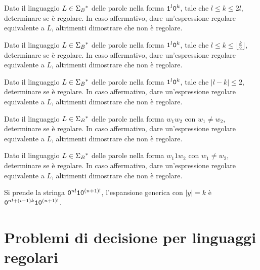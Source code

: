 \begin{Exercise}\label{exe:pump-01entrodoppio}
	Dato il linguaggio $L\in\Sigma_{B}{}^{\ast}$ delle parole nella forma $\mathtt{1}^{l}\mathtt{0}^{k}$, tale che $l\le k\le 2l$,
	determinare se è
	regolare.
	In  caso affermativo, dare un'espressione regolare equivalente a $L$, altrimenti dimostrare che non è regolare.
\end{Exercise}

\begin{Exercise}\label{exe:pump-01entrodoppio2}
	Dato il linguaggio $L\in\Sigma_{B}{}^{\ast}$ delle parole nella forma $\mathtt{1}^{l}\mathtt{0}^{k}$, tale che $l\le k\le \lfloor
		\frac{k}{2} \rfloor$,
	determinare se è
	regolare.
	In  caso affermativo, dare un'espressione regolare equivalente a $L$, altrimenti dimostrare che non è regolare.
\end{Exercise}


\begin{Exercise}\label{exe:pump-01absdiff}
	Dato il linguaggio $L\in\Sigma_{B}{}^{\ast}$ delle parole nella forma $\mathtt{1}^{l}\mathtt{0}^{k}$, tale che $|l - k| \le 2$,
	determinare se è
	regolare.
	In  caso affermativo, dare un'espressione regolare equivalente a $L$, altrimenti dimostrare che non è regolare.
\end{Exercise}


\begin{Exercise}\label{exe:pump-noncopie}
	Dato il linguaggio $L\in\Sigma_{B}{}^{\ast}$ delle parole nella forma $w_{1}w_{2}$ con $w_{1}\neq w_{2}$, determinare se è
	regolare.
	In  caso affermativo, dare un'espressione regolare equivalente a $L$, altrimenti dimostrare che non è regolare.
\end{Exercise}


\begin{Exercise}\label{exe:pump-noncopiecon1}
	Dato il linguaggio $L\in\Sigma_{B}{}^{\ast}$ delle parole nella forma $w_{1}1w_{2}$ con $w_{1}\neq w_{2}$, determinare se è
	regolare.
	In  caso affermativo, dare un'espressione regolare equivalente a $L$, altrimenti dimostrare che non è regolare.
\end{Exercise}

Si prende la stringa $\mathtt{0}^{n!}\mathtt{1}\mathtt{0}^{(n+1)!}$, l'espansione generica con $|y| = k$ è  $\mathtt{0}^{n! + (i-1)k}\mathtt{1}\mathtt{0}^{(n+1)!}$.


\section{Problemi di decisione per linguaggi regolari}
\label{sec:problemi-decisione-ER}

